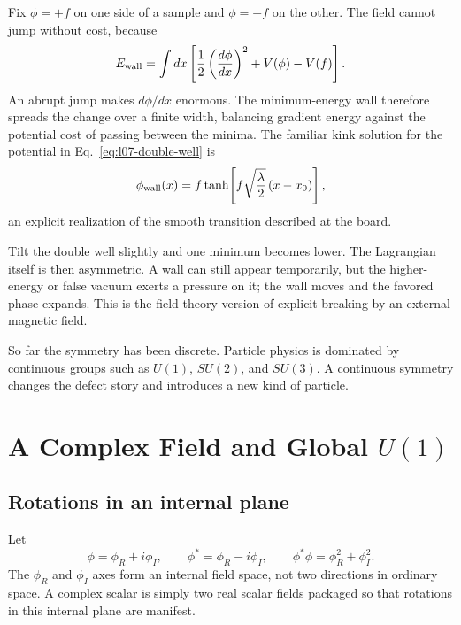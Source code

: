 Fix \(\phi=+f\) on one side of a sample and \(\phi=-f\) on the other. The
field cannot jump without cost, because
\begin{equation}
  E_{\rm wall}
  =\int dx\left[
      \frac12\left(\frac{d\phi}{dx}\right)^2+V(\phi)-V(f)
    \right].
  \label{eq:l07-wall-energy}
\end{equation}
An abrupt jump makes \(d\phi/dx\) enormous. The minimum-energy wall therefore
spreads the change over a finite width, balancing gradient energy against the
potential cost of passing between the minima. The familiar kink solution for
the potential in Eq.~\eqref{eq:l07-double-well} is
\begin{equation}
  \phi_{\rm wall}(x)
  =f\tanh\!\left[f\sqrt{\frac{\lambda}{2}}\,(x-x_0)\right],
  \label{eq:l07-kink}
\end{equation}
an explicit realization of the smooth transition described at the board.

Tilt the double well slightly and one minimum becomes lower. The Lagrangian
itself is then asymmetric. A wall can still appear temporarily, but the
higher-energy or false vacuum exerts a pressure on it; the wall moves and
the favored phase expands. This is the field-theory version of explicit
breaking by an external magnetic field.

So far the symmetry has been discrete. Particle physics is dominated by
continuous groups such as \(U(1)\), \(SU(2)\), and \(SU(3)\). A continuous
symmetry changes the defect story and introduces a new kind of particle.

\section{A Complex Field and Global \texorpdfstring{\(U(1)\)}{U(1)}}

\subsection{Rotations in an internal plane}

Let
\begin{equation}
  \phi=\phi_R+i\phi_I,
  \qquad
  \phi^*=\phi_R-i\phi_I,
  \qquad
  \phi^*\phi=\phi_R^2+\phi_I^2.
  \label{eq:l07-components}
\end{equation}
The \(\phi_R\) and \(\phi_I\) axes form an internal field space, not two
directions in ordinary space. A complex scalar is simply two real scalar
fields packaged so that rotations in this internal plane are manifest.

